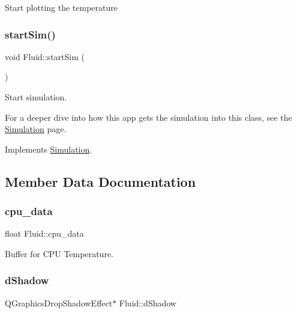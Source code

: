 Start plotting the temperature \mbox{\label{classFluid_af249a75d7ef113842c226b8b939c8f90}} 
\subsubsection{\texorpdfstring{startSim()}{startSim()}}
{\footnotesize\ttfamily void Fluid\+::start\+Sim (\begin{DoxyParamCaption}{ }\end{DoxyParamCaption})\hspace{0.3cm}{\ttfamily [virtual]}}

Start simulation.

For a deeper dive into how this app gets the simulation into this class, see the \mbox{\hyperlink{classSimulation}{Simulation}} page. 

Implements \mbox{\hyperlink{classSimulation_ac523544ffc2b4cffed1d2a6ead5809b1}{Simulation}}.



\subsection{Member Data Documentation}
\mbox{\label{classFluid_a596fd99b82b4553495b12f353488848e}} 
\subsubsection{\texorpdfstring{cpu\_data}{cpu\_data}}
{\footnotesize\ttfamily float Fluid\+::cpu\+\_\+data\hspace{0.3cm}{\ttfamily [private]}}



Buffer for C\+PU Temperature. 

\mbox{\label{classFluid_a3e51c9ed538056955fd16efd6b8519a2}} 
\subsubsection{\texorpdfstring{dShadow}{dShadow}}
{\footnotesize\ttfamily Q\+Graphics\+Drop\+Shadow\+Effect$\ast$ Fluid\+::d\+Shadow\hspace{0.3cm}{\ttfamily [private]}}

